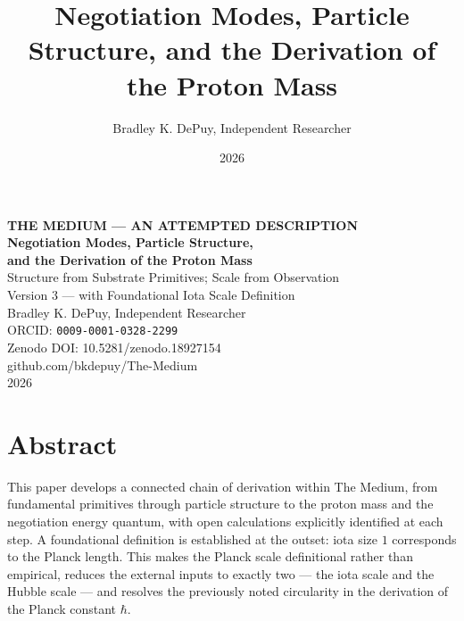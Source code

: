 \documentclass[11pt,letterpaper]{article}
\author{Bradley K. DePuy, Independent Researcher}
\date{2026}
\title{Negotiation Modes, Particle Structure, and the Derivation of the Proton Mass}
\begin{document}
\pagestyle{plain}
\begin{titlepage}
\vspace*{3cm}
\begin{center}
  {\large\bfseries THE MEDIUM --- AN ATTEMPTED DESCRIPTION}\\[1em]
  {\LARGE\bfseries Negotiation Modes, Particle Structure,}\\[0.4em]
  {\LARGE\bfseries and the Derivation of the Proton Mass}\\[0.4em]
  {\large Structure from Substrate Primitives; Scale from Observation}\\[0.3em]
  {\normalsize Version 3 --- with Foundational Iota Scale Definition}\\[2em]
  {\normalsize Bradley K. DePuy, Independent Researcher}\\[0.4em]
  {\normalsize ORCID: \texttt{0009-0001-0328-2299}}\\[0.4em]
  {\normalsize Zenodo DOI: 10.5281/zenodo.18927154}\\[0.4em]
  {\normalsize github.com/bkdepuy/The-Medium}\\[0.4em]
  {\normalsize 2026}
\end{center}
\end{titlepage}
\pagestyle{body}

\section{Abstract}
\label{sec:orgf7efeca}

This paper develops a connected chain of derivation within The Medium, from fundamental primitives through particle structure to the proton mass and the negotiation energy quantum, with open calculations explicitly identified at each step. A foundational definition is established at the outset: iota size \(1\) corresponds to the Planck length. This makes the Planck scale definitional rather than empirical, reduces the external inputs to exactly two --- the iota scale and the Hubble scale --- and resolves the previously noted circularity in the derivation of the Planck constant \(\hbar\).
\end{document}
